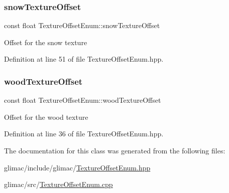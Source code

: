\subsubsection{\texorpdfstring{snow\+Texture\+Offset}{snowTextureOffset}}
{\footnotesize\ttfamily const float Texture\+Offset\+Enum\+::snow\+Texture\+Offset\hspace{0.3cm}{\ttfamily [static]}}

Offset for the snow texture 

Definition at line 51 of file Texture\+Offset\+Enum.\+hpp.

\mbox{\label{class_texture_offset_enum_aa2e307d0364345fc9dab4e3e77f5514c}} 
\subsubsection{\texorpdfstring{wood\+Texture\+Offset}{woodTextureOffset}}
{\footnotesize\ttfamily const float Texture\+Offset\+Enum\+::wood\+Texture\+Offset\hspace{0.3cm}{\ttfamily [static]}}

Offset for the wood texture 

Definition at line 36 of file Texture\+Offset\+Enum.\+hpp.



The documentation for this class was generated from the following files\+:\begin{DoxyCompactItemize}
\item 
glimac/include/glimac/\hyperlink{_texture_offset_enum_8hpp}{Texture\+Offset\+Enum.\+hpp}\item 
glimac/src/\hyperlink{_texture_offset_enum_8cpp}{Texture\+Offset\+Enum.\+cpp}\end{DoxyCompactItemize}
